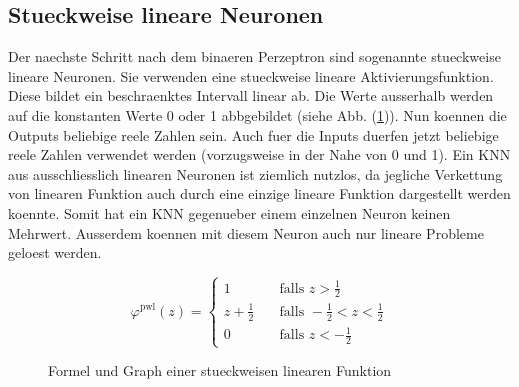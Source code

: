 \cite{wiki:kuenstliches_neuron}
\cite{wiki:perzeptron}

\subsection{Stueckweise lineare Neuronen}
Der naechste Schritt nach dem binaeren Perzeptron sind sogenannte stueckweise
lineare Neuronen.
Sie verwenden eine stueckweise lineare Aktivierungsfunktion. Diese bildet ein
beschraenktes Intervall linear ab. Die Werte ausserhalb werden auf die
konstanten Werte 0 oder 1 abbgebildet (siehe Abb. (\ref{fig:stueckweiselinear})).
\para{}
Nun koennen die Outputs beliebige reele Zahlen sein. Auch fuer die Inputs duerfen
jetzt beliebige reele Zahlen verwendet werden (vorzugsweise in der Nahe von 0
und 1).
Ein KNN aus ausschliesslich linearen Neuronen ist ziemlich nutzlos, da jegliche Verkettung von
linearen Funktion auch durch eine einzige lineare Funktion dargestellt werden
koennte. Somit hat ein KNN gegenueber einem einzelnen Neuron keinen Mehrwert.
Ausserdem koennen mit diesem Neuron auch nur lineare Probleme geloest werden.
\\
\begin{figure}[h!]
  \begin{minipage}[h!]{0.5\textwidth}
    \begin{equation*}
      \varphi^{\text{pwl}}(z) =
      \begin{cases}
        1 & \quad \text{falls } z > \frac{1}{2}\\
        z + \frac{1}{2} & \quad \text{falls } -\frac{1}{2} < z < \frac{1}{2}\\
        0 & \quad \text{falls } z < -\frac{1}{2}
      \end{cases}
    \end{equation*}
  \end{minipage}
  \begin{minipage}[h!]{0.5\textwidth}
    \centering
  \end{minipage}
  \caption{Formel und Graph einer stueckweisen linearen Funktion}
  \label{fig:stueckweiselinear}
\end{figure}

